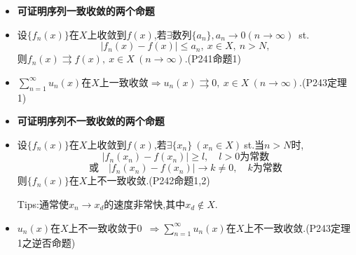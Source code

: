 \documentclass[UTF8]{ctexart}
\newenvironment{itemizeg}{\begin{itemize}}{\end{itemize}}
\newenvironment{itemizeb}{\begin{itemize}}{\end{itemize}}
\begin{document}
\begin{itemizeg}
    \item[]\textbf{可证明序列一致收敛的两个命题}
    \item 设$\{f_n(x)\}$在$X$上收敛到$f(x)$,若$\exists$数列$\{a_n\},a_n\rightarrow0(n\rightarrow\infty)$\ st.
    $$|f_n(x)-f(x)|\leq a_n,\ x\in X,\ n>N,$$
    则$f_n(x)\rightrightarrows f(x),\ x\in X\ (n\rightarrow\infty).$(P241命题1)
    \item $\sum_{n=1}^\infty u_n(x)$在$X$上一致收敛$\Longrightarrow u_n(x)\rightrightarrows 0,\ x\in X\ (n\rightarrow\infty).$(P243定理1)
\end{itemizeg}

\begin{itemizeb}
    \item[]\textbf{可证明序列不一致收敛的两个命题}
    \item 设$\{f_n(x)\}$在$X$上收敛到$f(x)$,若$\exists\{x_n\}\ (x_n\in X)\ $st.当$n>N$时,
    $$|f_n(x_n)-f(x_n)|\geq l,\quad l>0\text{为常数}$$
    $$\text{或}\quad |f_n(x_n)-f(x_n)|\rightarrow k\neq 0,\quad k\text{为常数}$$
    则$\{f_n(x)\}$在$X$上不一致收敛.(P242命题1,2)

    Tips:通常使$x_n\rightarrow x_d$的速度非常快,其中$x_d\not\in X$.
    \item$ u_n(x)$在$X$上不一致收敛于0\ $\Longrightarrow\sum_{n=1}^\infty u_n(x)$在$X$上不一致收敛.(P243定理1之逆否命题)
\end{itemizeb}
\end{document}

